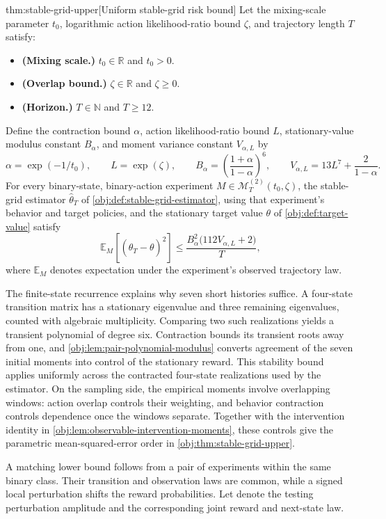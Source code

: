 \documentclass[11pt]{article}
\begin{document}
\begin{theoremv}{thm:stable-grid-upper}[Uniform stable-grid risk bound]
Let the mixing-scale parameter \(t_0\), logarithmic action likelihood-ratio bound \(\zeta\), and trajectory length \(T\) satisfy:
\begin{itemize}
\item \textbf{(Mixing scale.)} \(t_0\in\mathbb R\) and \(t_0>0\).
\item \textbf{(Overlap bound.)} \(\zeta\in\mathbb R\) and \(\zeta\geq0\).
\item \textbf{(Horizon.)} \(T\in\mathbb N\) and \(T\geq12\).
\end{itemize}
Define the contraction bound \(\alpha\), action likelihood-ratio bound \(L\), stationary-value modulus constant \(B_\alpha\), and moment variance constant \(V_{\alpha,L}\) by
\[
\alpha=\exp(-1/t_0),\qquad
L=\exp(\zeta),\qquad
B_\alpha=\left(\frac{1+\alpha}{1-\alpha}\right)^6,\qquad
V_{\alpha,L}=13L^7+\frac{2}{1-\alpha}.
\]
For every binary-state, binary-action experiment \(M\in\mathcal M_T^{(2)}(t_0,\zeta)\), the stable-grid estimator \(\widehat\theta_T\) of \cref{obj:def:stable-grid-estimator}, using that experiment's behavior and target policies, and the stationary target value \(\theta\) of \cref{obj:def:target-value} satisfy
\[
\mathbb E_M\!\left[(\widehat\theta_T-\theta)^2\right]
\leq
\frac{B_\alpha^2\bigl(112V_{\alpha,L}+2\bigr)}{T},
\]
where \(\mathbb E_M\) denotes expectation under the experiment's observed trajectory law.
\end{theoremv}

The finite-state recurrence explains why seven short histories suffice. A four-state transition matrix has a stationary eigenvalue and three remaining eigenvalues, counted with algebraic multiplicity. Comparing two such realizations yields a transient polynomial of degree six. Contraction bounds its transient roots away from one, and \cref{obj:lem:pair-polynomial-modulus} converts agreement of the seven initial moments into control of the stationary reward. This stability bound applies uniformly across the contracted four-state realizations used by the estimator. On the sampling side, the empirical moments involve overlapping windows: action overlap controls their weighting, and behavior contraction controls dependence once the windows separate. Together with the intervention identity in \cref{obj:lem:observable-intervention-moments}, these controls give the parametric mean-squared-error order in \cref{obj:thm:stable-grid-upper}.

A matching lower bound follows from a pair of experiments within the same binary class. Their transition and observation laws are common, while a signed local perturbation shifts the reward probabilities. Let  denote the testing perturbation amplitude and  the corresponding joint reward and next-state law.
\end{document}
